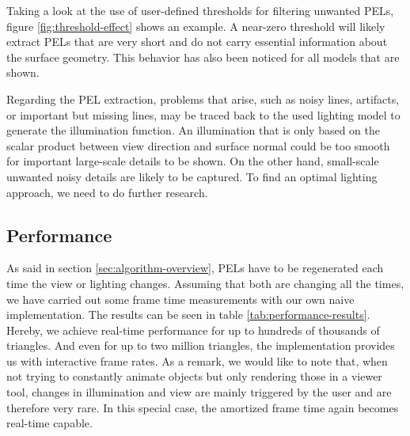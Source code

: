 \documentclass[9pt,fleqn,twoside,twocolumn]{stdglobal}
\begin{document}
    Taking a look at the use of user-defined thresholds for filtering unwanted PELs, figure \ref{fig:threshold-effect} shows an example.
    A near-zero threshold will likely extract PELs that are very short and do not carry essential information about the surface geometry.
    This behavior has also been noticed for all models that are shown.

    Regarding the PEL extraction, problems that arise, such as noisy lines, artifacts, or important but missing lines, may be traced back to the used lighting model to generate the illumination function.
    An illumination that is only based on the scalar product between view direction and surface normal could be too smooth for important large-scale details to be shown.
    On the other hand, small-scale unwanted noisy details are likely to be captured.
    To find an optimal lighting approach, we need to do further research.

  \subsection{Performance}
    As said in section \ref{sec:algorithm-overview}, PELs have to be regenerated each time the view or lighting changes.
    Assuming that both are changing all the times, we have carried out some frame time measurements with our own naive implementation.
    The results can be seen in table \ref{tab:performance-results}.
    Hereby, we achieve real-time performance for up to hundreds of thousands of triangles.
    And even for up to two million triangles, the implementation provides us with interactive frame rates.
    As a remark, we would like to note that, when not trying to constantly animate objects but only rendering those in a viewer tool, changes in illumination and view are mainly triggered by the user and are therefore very rare.
    In this special case, the amortized frame time again becomes real-time capable.
\end{document}
